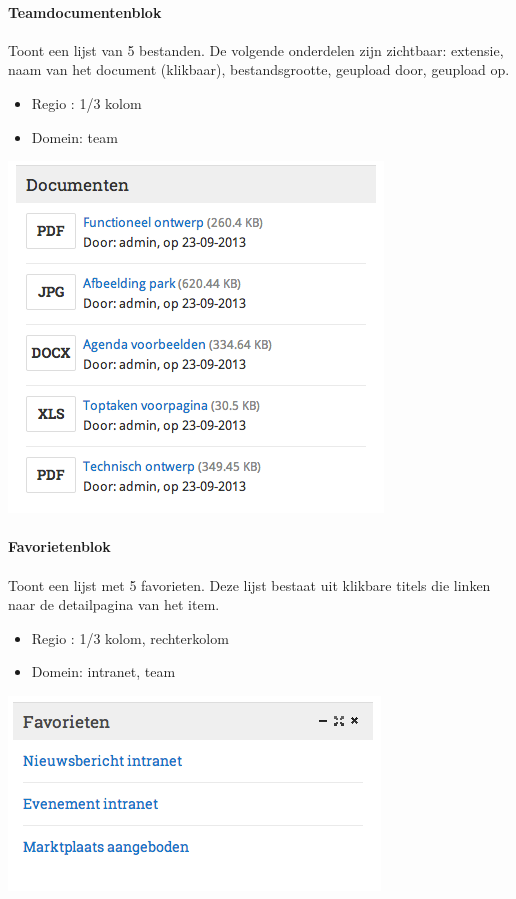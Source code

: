 \paragraph{Teamdocumentenblok}

Toont een lijst van 5 bestanden. De volgende onderdelen zijn zichtbaar: extensie, naam van het document (klikbaar), bestandsgrootte, geupload door, geupload op.

\begin{itemize}
\item Regio : 1/3 kolom
\item Domein: team
\end{itemize}

\begin{center}
	\includegraphics[scale=0.5]{img/blokken/teamdocumenten.png}
\end{center}

\paragraph{Favorietenblok}

Toont een lijst met 5 favorieten. Deze lijst bestaat uit klikbare titels die linken naar de detailpagina van het item.

\begin{itemize}
\item Regio : 1/3 kolom, rechterkolom
\item Domein: intranet, team
\end{itemize}

\begin{center}
	\includegraphics[scale=0.5]{img/blokken/favorieten.png}
\end{center}

